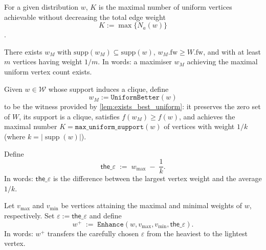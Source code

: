 \begin{definition}
  \label{def:max_uniform_support}
  \leanok
For a given distribution \(w\), \(K\) is the maximal number of uniform vertices achievable without decreasing the total edge weight
\[K := \max \{ N_a(w) \}\].
\end{definition}

\begin{lemma}
  \label{lem:exists_best_uniform}
  \leanok
There exists \(w_M\) with \(\mathrm{supp}(w_M) \subseteq \mathrm{supp}(w)\), \(w_M.\mathrm{fw} \geq W.\mathrm{fw}\), and with at least \(m\) vertices having weight \(1/m\).
In words: a maximiser \(w_M\) achieving the maximal uniform vertex count exists.
\end{lemma}

\begin{definition}[UniformBetter]
  \label{def:UniformBetter}
  \leanok
Given \(w\in\mathcal{W}\) whose support induces a clique, define
\[
w_M := \texttt{UniformBetter}(w)
\]
to be the witness provided by \autoref{lem:exists_best_uniform}: it preserves the zero set of \(W\), its support is a clique, satisfies \(f(w_M)\ge f(w)\), and achieves the maximal number \(K=\texttt{max\_uniform\_support}(w)\) of vertices with weight \(1/k\) (where \(k=|\operatorname{supp}(w)|\)).
\end{definition}

\begin{definition}
  \label{def:the_eps}
  \leanok
Define
\[
\mathsf{the\_\varepsilon} \;:=\; w_{\max} \;-\; \frac{1}{k}.
\]
In words: \(\mathsf{the\_\varepsilon}\) is the difference between the largest vertex weight and the average \(1/k\).
\end{definition}

\begin{definition}
  \label{def:Enhanced}
  \leanok
Let \(v_{\max}\) and \(v_{\min}\) be vertices attaining the maximal and minimal weights of \(w\), respectively. Set \(\varepsilon := \mathsf{the\_\varepsilon}\) and define
\[
  w^+ \;:=\; \texttt{Enhance}(w, v_{\max}, v_{\min}, \mathsf{the\_\varepsilon}).
\]
In words: \(w^+\) transfers the carefully chosen \(\varepsilon\) from the heaviest to the lightest vertex.
\end{definition}

